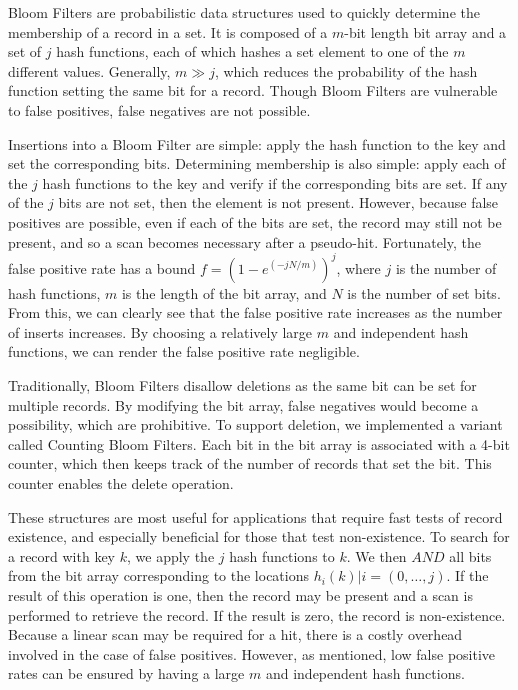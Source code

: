 Bloom Filters\cite{bloomfilter1} are probabilistic data structures used to
quickly determine the membership of a record in a set. It is composed of a
$m$-bit length bit array and a set of $j$ hash functions, each of which hashes
a set element to one of the $m$ different values. Generally, $m \gg j$, which
reduces the probability of the hash function setting the same bit for a record.
Though Bloom Filters are vulnerable to false positives, false negatives are not
possible.

Insertions into a Bloom Filter are simple: apply the hash function to the key
and set the corresponding bits. Determining membership is also simple: apply
each of the $j$ hash functions to the key and verify if the corresponding bits
are set. If any of the $j$ bits are not set, then the element is not present.
However, because false positives are possible, even if each of the bits are
set, the record may still not be present, and so a scan becomes necessary after
a pseudo-hit. Fortunately, the false positive rate has a bound $f = (1 -
e^{(-jN/m)})^j$, where $j$ is the number of hash functions, $m$ is the length
of the bit array, and $N$ is the number of set bits. From this, we can clearly
see that the false positive rate increases as the number of inserts increases.
By choosing a relatively large $m$ and independent hash functions, we can
render the false positive rate negligible\cite{falsepositive}.

Traditionally, Bloom Filters disallow deletions as the same bit can be set for
multiple records. By modifying the bit array, false negatives would become a
possibility, which are prohibitive. To support deletion, we implemented a
variant called Counting Bloom Filters\cite{countingbloom1,countingbloom2}. Each
bit in the bit array is associated with a 4-bit counter, which then keeps track
of the number of records that set the bit. This counter enables the delete
operation.

These structures are most useful for applications that require fast tests of
record existence, and especially beneficial for those that test non-existence.
To search for a record with key $k$, we apply the $j$ hash functions to $k$. We
then $AND$ all bits from the bit array corresponding to the locations $h_i(k) |
i = (0,\ldots,j)$. If the result of this operation is one, then the record may be
present and a scan is performed to retrieve the record. If the result is zero,
the record is non-existence. Because a linear scan may be required for a hit,
there is a costly overhead involved in the case of false positives. However, as
mentioned, low false positive rates can be ensured by having a large $m$ and
independent hash functions.

